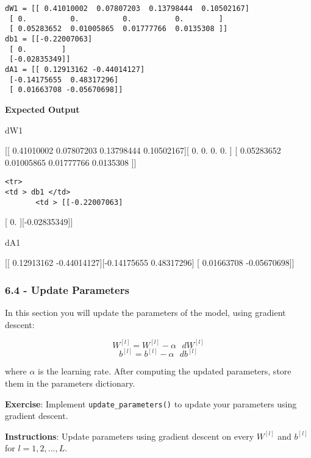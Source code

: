 \documentclass[11pt]{article}
\begin{document}
    \begin{Verbatim}[commandchars=\\\{\}]
dW1 = [[ 0.41010002  0.07807203  0.13798444  0.10502167]
 [ 0.          0.          0.          0.        ]
 [ 0.05283652  0.01005865  0.01777766  0.0135308 ]]
db1 = [[-0.22007063]
 [ 0.        ]
 [-0.02835349]]
dA1 = [[ 0.12913162 -0.44014127]
 [-0.14175655  0.48317296]
 [ 0.01663708 -0.05670698]]

    \end{Verbatim}

    \textbf{Expected Output}

dW1

{[}{[} 0.41010002 0.07807203 0.13798444 0.10502167{]}{[} 0. 0. 0. 0. {]}
{[} 0.05283652 0.01005865 0.01777766 0.0135308 {]}{]}

\begin{verbatim}
<tr>
<td > db1 </td> 
       <td > [[-0.22007063]
\end{verbatim}

{[} 0. {]}{[}-0.02835349{]}{]}

dA1

{[}{[} 0.12913162 -0.44014127{]}{[}-0.14175655 0.48317296{]} {[}
0.01663708 -0.05670698{]}{]}

    \subsubsection{6.4 - Update Parameters}\label{update-parameters}

In this section you will update the parameters of the model, using
gradient descent:

\[ W^{[l]} = W^{[l]} - \alpha \text{ } dW^{[l]} \tag{16}\]
\[ b^{[l]} = b^{[l]} - \alpha \text{ } db^{[l]} \tag{17}\]

where $\alpha$ is the learning rate. After computing the updated
parameters, store them in the parameters dictionary.

    \textbf{Exercise}: Implement \texttt{update\_parameters()} to update
your parameters using gradient descent.

\textbf{Instructions}: Update parameters using gradient descent on every
$W^{[l]}$ and $b^{[l]}$ for $l = 1, 2, ..., L$.
\end{document}
